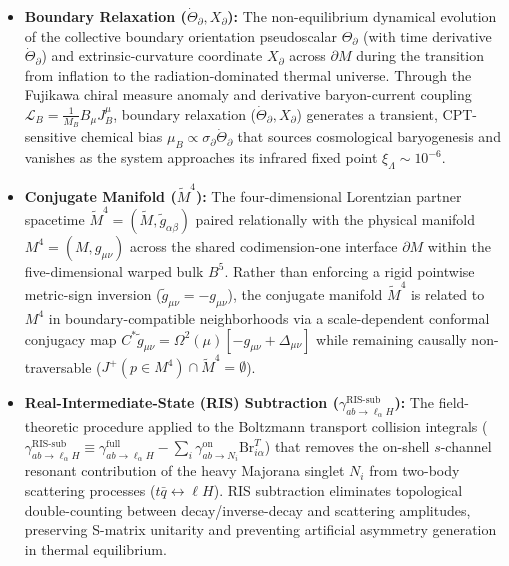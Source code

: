 \documentclass[aps,prd,onecolumn,superscriptaddress,nofootinbib,longbibliography,10pt]{revtex4-2}
\begin{document}
\begin{itemize}
    
\item \textbf{Boundary Relaxation (\(\dot{\Theta}_\partial, X_\partial\)):} The non-equilibrium dynamical evolution of the collective boundary orientation pseudoscalar \(\Theta_\partial\) (with time derivative \(\dot{\Theta}_\partial\)) and extrinsic-curvature coordinate \(X_\partial\) across \(\partial M\) during the transition from inflation to the radiation-dominated thermal universe. Through the Fujikawa chiral measure anomaly and derivative baryon-current coupling \(\mathcal{L}_B = \frac{1}{M_B}B_\mu J_B^\mu\), boundary relaxation (\(\dot{\Theta}_\partial, X_\partial\)) generates a transient, CPT-sensitive chemical bias \(\mu_B \propto \sigma_\partial \dot{\Theta}_\partial\) that sources cosmological baryogenesis and vanishes as the system approaches its infrared fixed point \(\xi_\Lambda \sim 10^{-6}\).
    
\item \textbf{Conjugate Manifold (\(\tilde{M}^4\)):} The four-dimensional Lorentzian partner spacetime \(\tilde{M}^4 = (\tilde{M}, \tilde{g}_{\alpha\beta})\) paired relationally with the physical manifold \(M^4 = (M, g_{\mu\nu})\) across the shared codimension-one interface \(\partial M\) within the five-dimensional warped bulk \(B^5\). Rather than enforcing a rigid pointwise metric-sign inversion (\(\tilde{g}_{\mu\nu} = -g_{\mu\nu}\)), the conjugate manifold \(\tilde{M}^4\) is related to \(M^4\) in boundary-compatible neighborhoods via a scale-dependent conformal conjugacy map \(C^*\tilde{g}_{\mu\nu} = \Omega^2(\mu)[-g_{\mu\nu} + \Delta_{\mu\nu}]\) while remaining causally non-traversable (\(J^+(p \in M^4) \cap \tilde{M}^4 = \emptyset\)).
    
\item \textbf{Real-Intermediate-State (RIS) Subtraction (\(\gamma_{ab\to\ell_\alpha H}^{\text{RIS-sub}}\)):} The field-theoretic procedure applied to the Boltzmann transport collision integrals (\(\gamma_{ab\to\ell_\alpha H}^{\text{RIS-sub}} \equiv \gamma_{ab\to\ell_\alpha H}^{\text{full}} - \sum_i \gamma_{ab\to N_i}^{\text{on}}\text{Br}_{i\alpha}^T\)) that removes the on-shell \(s\)-channel resonant contribution of the heavy Majorana singlet \(N_i\) from two-body scattering processes (\(t\bar{q} \leftrightarrow \ell H\)). RIS subtraction eliminates topological double-counting between decay/inverse-decay and scattering amplitudes, preserving S-matrix unitarity and preventing artificial asymmetry generation in thermal equilibrium.
    

\end{itemize}
\end{document}
